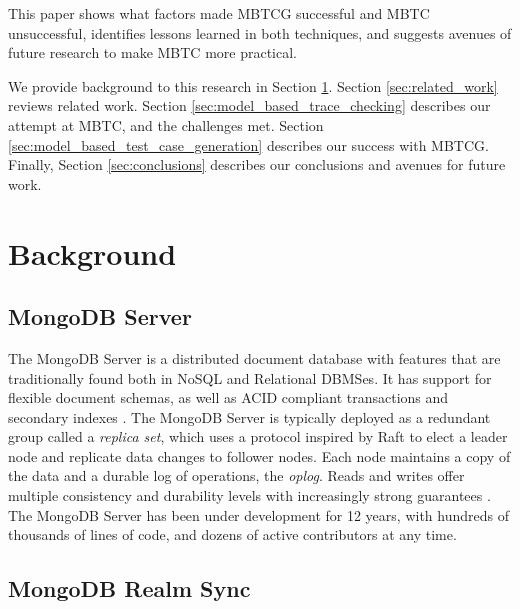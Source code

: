 \documentclass{vldb}
\begin{document}
This paper shows what factors made MBTCG successful and MBTC unsuccessful,
identifies lessons learned in both techniques, and suggests avenues of future research to make MBTC more practical.

We provide background to this research in Section \ref{sec:background}. 
Section \ref{sec:related_work} reviews related work. 
Section \ref{sec:model_based_trace_checking} describes our attempt at MBTC, and the challenges met. 
Section \ref{sec:model_based_test_case_generation} describes our success with MBTCG. 
Finally, Section \ref{sec:conclusions} describes our conclusions and avenues for future work.

\section{Background}
\label{sec:background}

\subsection{MongoDB Server}
\label{subsec:background_server}

The MongoDB Server is a distributed document database with features that are traditionally found both in NoSQL and Relational DBMSes.
It has support for flexible document schemas, as well as ACID compliant transactions and secondary indexes \cite{Kamsky19TPCCMongoDB}.
The MongoDB Server is typically deployed as a redundant group called a \textit{replica set}, which uses a protocol inspired by Raft \cite{Ongaro14Raft} to elect a leader node and replicate data changes to follower nodes.
Each node maintains a copy of the data and a durable log of operations, the \textit{oplog}.
Reads and writes offer multiple consistency and durability levels with increasingly strong guarantees \cite{Schultz19TunableConsistency, Tyulenev19CausalConsistencyMongoDB}.
The MongoDB Server has been under development for 12 years, with hundreds of thousands of lines of code, and dozens of active contributors at any time.

\subsection{MongoDB Realm Sync}
\label{subsec:background_realm}
\end{document}
